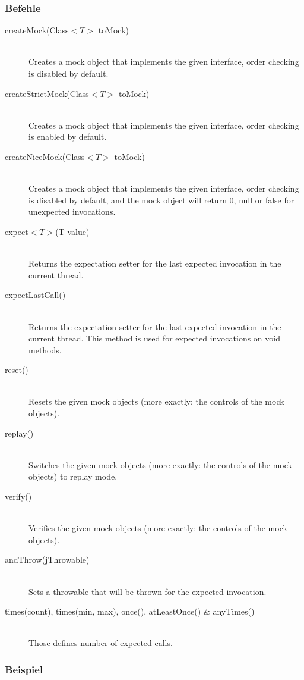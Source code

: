 \documentclass[a4paper,10pt]{article}
\begin{document}
\subsubsection{Befehle}
\begin{description}
	\item[createMock(Class$<T>$ toMock)] \hfill \\
		Creates a mock object that implements the given interface, order checking is disabled by default.
	\item[createStrictMock(Class$<T>$ toMock)] \hfill \\
		Creates a mock object that implements the given interface, order checking is enabled by default.
	\item[createNiceMock(Class$<T>$ toMock)] \hfill \\
		Creates a mock object that implements the given interface, order checking is disabled by default, and the mock object will return 0, null or false for unexpected invocations.
	\item[expect$<T>$(T value)] \hfill \\
		Returns the expectation setter for the last expected invocation in the current thread.
	\item[expectLastCall()] \hfill \\
		Returns the expectation setter for the last expected invocation in the current thread. This method is used for expected invocations on void methods. 
	\item[reset()] \hfill \\
		Resets the given mock objects (more exactly: the controls of the mock objects).
	\item[replay()] \hfill \\
		 Switches the given mock objects (more exactly: the controls of the mock objects) to replay mode.
	\item[verify()] \hfill \\
		Verifies the given mock objects (more exactly: the controls of the mock objects).	 
	\item[andThrow(jThrowable)] \hfill \\
		Sets a throwable that will be thrown for the expected invocation.
	\item[times(count), times(min, max), once(), atLeastOnce() \& anyTimes()] \hfill \\
		Those defines number of expected calls.
\end{description}

\subsubsection{Beispiel}

\end{document}
